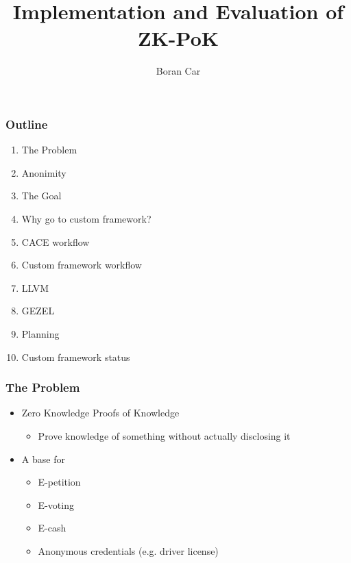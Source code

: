 \documentclass{beamer}
\title{Implementation and Evaluation of ZK-PoK}
\author{Boran Car}
\institute{K. U. Leuven}
\begin{document}
\begin{frame}
  \titlepage
\end{frame}

\begin{frame}
  \frametitle{Outline}

  \begin{enumerate}
  \item The Problem
  \item Anonimity
  \item The Goal
  \item Why go to custom framework?
  \item CACE workflow
  \item Custom framework workflow
  \item LLVM
  \item GEZEL
  \item Planning
  \item Custom framework status
  \end{enumerate}
\end{frame}

\begin{frame}
  \frametitle{The Problem}

  \begin{itemize}
  \item Zero Knowledge Proofs of Knowledge
    \begin{itemize}
    \item Prove knowledge of something without actually disclosing it
    \end{itemize}
  \item A base for
    \begin{itemize}
    \item E-petition
    \item E-voting
    \item E-cash
    \item Anonymous credentials (e.g. driver license)
    \end{itemize}
  \end{itemize}
\end{frame}
\end{document}
